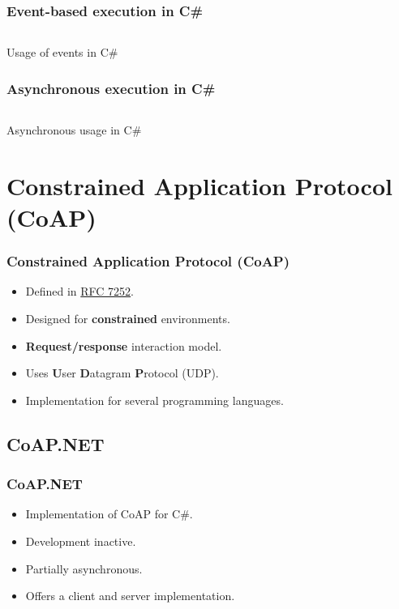 \documentclass[11pt,t,usepdftitle=false,aspectratio=169,usenames,dvipsnames]{beamer}
\begin{document}
    \begin{frame}
        \frametitle{Event-based execution in C\#}
        
        \begin{listing}[H]
            \inputminted[framesep=2mm, baselinestretch=1.2, fontsize=\scriptsize, linenos]{csharp}{codes/example_eventbased.cs}
            \caption{Usage of events in C\#}
            \label{listing:usage-of-events-in-csharp}
        \end{listing}
    \end{frame}

    \begin{frame}
        \frametitle{Asynchronous execution in C\#}

        \begin{listing}[H]
            \inputminted[framesep=2mm, baselinestretch=1.2, fontsize=\scriptsize, linenos]{csharp}{codes/example_asynchronous.cs}
            \caption{Asynchronous usage in C\#}
            \label{listing:asynchronous-usage-in-csharp}
        \end{listing}
    \end{frame}

    \section{Constrained Application Protocol (CoAP)}
    \begin{frame}
        \frametitle{Constrained Application Protocol (CoAP)}
        \begin{itemize}
            \item<1-> Defined in \href{https://tools.ietf.org/html/rfc7252}{RFC 7252}.
            \item<2-> Designed for \textcolor{uibkblue}{\textbf{constrained}} environments.
            \item<3-> \textcolor{uibkblue}{\textbf{Request/response}} interaction model.
            \item<4-> Uses \textcolor{uibkblue}{\textbf{U}}ser \textcolor{uibkblue}{\textbf{D}}atagram \textcolor{uibkblue}{\textbf{P}}rotocol (UDP).
            \item<5-> Implementation for several programming languages.
        \end{itemize}
    \end{frame}

    \subsection{CoAP.NET}
    \begin{frame}
        \frametitle{CoAP.NET}
        \begin{itemize}
            \item<1-> Implementation of CoAP for C\#.
            \item<2-> Development inactive.
            \item<3-> Partially asynchronous.
            \item<4-> Offers a client and server implementation.
        \end{itemize}
    \end{frame}
\end{document}

